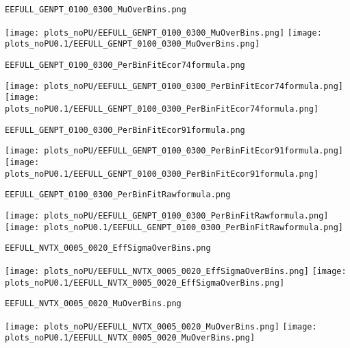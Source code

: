 \begin{frame}[fragile]
\begin{verbatim}
EEFULL_GENPT_0100_0300_MuOverBins.png
\end{verbatim}
\texttt{[image: plots\_noPU/EEFULL\_GENPT\_0100\_0300\_MuOverBins.png]}
\texttt{[image: plots\_noPU0.1/EEFULL\_GENPT\_0100\_0300\_MuOverBins.png]}
\end{frame}
\begin{frame}[fragile]
\begin{verbatim}
EEFULL_GENPT_0100_0300_PerBinFitEcor74formula.png
\end{verbatim}
\texttt{[image: plots\_noPU/EEFULL\_GENPT\_0100\_0300\_PerBinFitEcor74formula.png]}
\texttt{[image: plots\_noPU0.1/EEFULL\_GENPT\_0100\_0300\_PerBinFitEcor74formula.png]}
\end{frame}
\begin{frame}[fragile]
\begin{verbatim}
EEFULL_GENPT_0100_0300_PerBinFitEcor91formula.png
\end{verbatim}
\texttt{[image: plots\_noPU/EEFULL\_GENPT\_0100\_0300\_PerBinFitEcor91formula.png]}
\texttt{[image: plots\_noPU0.1/EEFULL\_GENPT\_0100\_0300\_PerBinFitEcor91formula.png]}
\end{frame}
\begin{frame}[fragile]
\begin{verbatim}
EEFULL_GENPT_0100_0300_PerBinFitRawformula.png
\end{verbatim}
\texttt{[image: plots\_noPU/EEFULL\_GENPT\_0100\_0300\_PerBinFitRawformula.png]}
\texttt{[image: plots\_noPU0.1/EEFULL\_GENPT\_0100\_0300\_PerBinFitRawformula.png]}
\end{frame}
\begin{frame}[fragile]
\begin{verbatim}
EEFULL_NVTX_0005_0020_EffSigmaOverBins.png
\end{verbatim}
\texttt{[image: plots\_noPU/EEFULL\_NVTX\_0005\_0020\_EffSigmaOverBins.png]}
\texttt{[image: plots\_noPU0.1/EEFULL\_NVTX\_0005\_0020\_EffSigmaOverBins.png]}
\end{frame}
\begin{frame}[fragile]
\begin{verbatim}
EEFULL_NVTX_0005_0020_MuOverBins.png
\end{verbatim}
\texttt{[image: plots\_noPU/EEFULL\_NVTX\_0005\_0020\_MuOverBins.png]}
\texttt{[image: plots\_noPU0.1/EEFULL\_NVTX\_0005\_0020\_MuOverBins.png]}
\end{frame}
